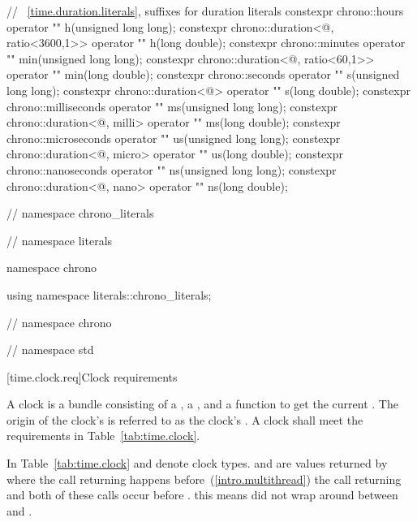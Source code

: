 \begin{codeblock}
{{{// ~\ref{time.duration.literals}, suffixes for duration literals
constexpr chrono::hours                                 operator "" h(unsigned long long);
constexpr chrono::duration<@\unspec@, ratio<3600,1>> operator "" h(long double);
constexpr chrono::minutes                               operator "" min(unsigned long long);
constexpr chrono::duration<@\unspec@, ratio<60,1>>   operator "" min(long double);
constexpr chrono::seconds                               operator "" s(unsigned long long);
constexpr chrono::duration<@\unspec@>                operator "" s(long double);
constexpr chrono::milliseconds                          operator "" ms(unsigned long long);
constexpr chrono::duration<@\unspec@, milli>         operator "" ms(long double);
constexpr chrono::microseconds                          operator "" us(unsigned long long);
constexpr chrono::duration<@\unspec@, micro>         operator "" us(long double);
constexpr chrono::nanoseconds                           operator "" ns(unsigned long long);
constexpr chrono::duration<@\unspec@, nano>          operator "" ns(long double);

}  // namespace chrono_literals
}  // namespace literals

namespace chrono {

using namespace literals::chrono_literals;

} // namespace chrono

}  // namespace std
\end{codeblock}

[time.clock.req]{Clock requirements}

\pnum
A clock is a bundle consisting of a , a
, and a function  to get the current .
The origin of the clock's  is referred to as the clock's .
 A clock shall meet the requirements in Table~\ref{tab:time.clock}.

\pnum
In Table~\ref{tab:time.clock}  and  denote clock types.  and
 are values returned by  where the call returning  happens
before~(\ref{intro.multithread}) the call returning  and both of these calls
occur
before .
\enternote this means  did not wrap around between  and
. \exitnote

